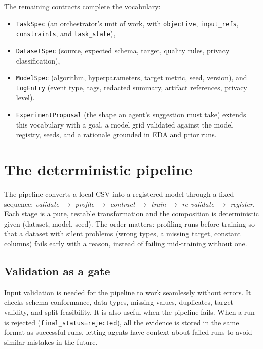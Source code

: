 The remaining contracts complete the vocabulary:

\begin{itemize}
	\item \texttt{TaskSpec} (an orchestrator's unit of work, with \texttt{objective}, \texttt{input\_refs}, \texttt{constraints}, and \texttt{task\_state}),
	\item \texttt{DatasetSpec} (source, expected schema, target, quality rules, privacy classification),
	\item \texttt{ModelSpec} (algorithm, hyperparameters, target metric, seed, version), and \texttt{LogEntry} (event type, tags, redacted summary, artifact references, privacy level).
	\item \texttt{ExperimentProposal} (the shape an agent's suggestion must take) extends this vocabulary with a goal, a model grid validated against the model registry, seeds, and a rationale grounded in EDA and prior runs.
\end{itemize}

\section{The deterministic pipeline}
\label{sec:pipeline}

The pipeline converts a local CSV into a registered model through a fixed sequence: \emph{validate $\rightarrow$ profile $\rightarrow$ contract $\rightarrow$ train $\rightarrow$ re-validate $\rightarrow$ register}. Each stage is a pure, testable transformation and the composition is deterministic given (dataset, model, seed). The order matters: profiling runs before training so that a dataset with silent problems (wrong types, a missing target, constant columns) fails early with a reason, instead of failing mid-training without one.

\subsection{Validation as a gate}

Input validation is needed for the pipeline to work seamlessly without errors. It checks schema conformance, data types, missing values, duplicates, target validity, and split feasibility. It is also useful when the pipeline fails. When a run is rejected (\texttt{final\_status=rejected}), all the evidence is stored in the same format as successful runs, letting agents have context about failed runs to avoid similar mistakes in the future.

